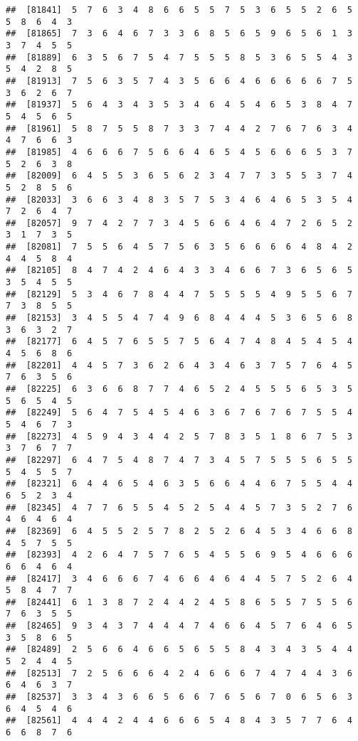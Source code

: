 \documentclass[
]{book}
\begin{document}
\begin{verbatim}
##  [81841]  5  7  6  3  4  8  6  6  5  5  7  5  3  6  5  5  2  6  5  5  8  6  4  3
##  [81865]  7  3  6  4  6  7  3  3  6  8  5  6  5  9  6  5  6  1  3  3  7  4  5  5
##  [81889]  6  3  5  6  7  5  4  7  5  5  5  8  5  3  6  5  5  4  3  5  4  2  8  5
##  [81913]  7  5  6  3  5  7  4  3  5  6  6  4  6  6  6  6  6  7  5  3  6  2  6  7
##  [81937]  5  6  4  3  4  3  5  3  4  6  4  5  4  6  5  3  8  4  7  5  4  5  6  5
##  [81961]  5  8  7  5  5  8  7  3  3  7  4  4  2  7  6  7  6  3  4  4  7  6  6  3
##  [81985]  4  6  6  6  7  5  6  6  4  6  5  4  5  6  6  6  5  3  7  5  2  6  3  8
##  [82009]  6  4  5  5  3  6  5  6  2  3  4  7  7  3  5  5  3  7  4  5  2  8  5  6
##  [82033]  3  6  6  3  4  8  3  5  7  5  3  4  6  4  6  5  3  5  4  7  2  6  4  7
##  [82057]  9  7  4  2  7  7  3  4  5  6  6  4  6  4  7  2  6  5  2  3  1  7  3  5
##  [82081]  7  5  5  6  4  5  7  5  6  3  5  6  6  6  6  4  8  4  2  4  4  5  8  4
##  [82105]  8  4  7  4  2  4  6  4  3  3  4  6  6  7  3  6  5  6  5  3  5  4  5  5
##  [82129]  5  3  4  6  7  8  4  4  7  5  5  5  5  4  9  5  5  6  7  7  3  8  5  5
##  [82153]  3  4  5  5  4  7  4  9  6  8  4  4  4  5  3  6  5  6  8  3  6  3  2  7
##  [82177]  6  4  5  7  6  5  5  7  5  6  4  7  4  8  4  5  4  5  4  4  5  6  8  6
##  [82201]  4  4  5  7  3  6  2  6  4  3  4  6  3  7  5  7  6  4  5  7  6  3  5  6
##  [82225]  6  3  6  6  8  7  7  4  6  5  2  4  5  5  5  6  5  3  5  5  6  5  4  5
##  [82249]  5  6  4  7  5  4  5  4  6  3  6  7  6  7  6  7  5  5  4  5  4  6  7  3
##  [82273]  4  5  9  4  3  4  4  2  5  7  8  3  5  1  8  6  7  5  3  3  7  6  7  7
##  [82297]  6  4  7  5  4  8  7  4  7  3  4  5  7  5  5  5  6  5  5  5  4  5  5  7
##  [82321]  6  4  4  6  5  4  6  3  5  6  6  4  4  6  7  5  5  4  4  6  5  2  3  4
##  [82345]  4  7  7  6  5  5  4  5  2  5  4  4  5  7  3  5  2  7  6  4  6  4  6  4
##  [82369]  6  4  5  5  2  5  7  8  2  5  2  6  4  5  3  4  6  6  8  4  5  7  5  5
##  [82393]  4  2  6  4  7  5  7  6  5  4  5  5  6  9  5  4  6  6  6  6  6  4  6  4
##  [82417]  3  4  6  6  6  7  4  6  6  4  6  4  4  5  7  5  2  6  4  5  8  4  7  7
##  [82441]  6  1  3  8  7  2  4  4  2  4  5  8  6  5  5  7  5  5  6  7  6  3  5  5
##  [82465]  9  3  4  3  7  4  4  4  7  4  6  6  4  5  7  6  4  6  5  3  5  8  6  5
##  [82489]  2  5  6  6  4  6  6  5  6  5  5  8  4  3  4  3  5  4  4  5  2  4  4  5
##  [82513]  7  2  5  6  6  6  4  2  4  6  6  6  7  4  7  4  4  3  6  6  4  6  3  7
##  [82537]  3  3  4  3  6  6  5  6  6  7  6  5  6  7  0  6  5  6  3  6  4  5  4  6
##  [82561]  4  4  4  2  4  4  6  6  6  5  4  8  4  3  5  7  7  6  4  6  6  8  7  6

\end{verbatim}
\end{document}
